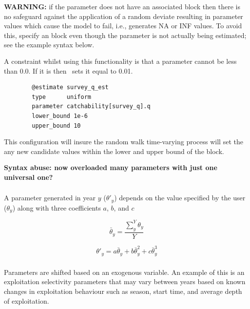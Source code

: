 \textbf{WARNING:} if the parameter does not have an associated  block then there is no safeguard against the application of a random deviate resulting in parameter values which cause the model to fail, i.e., generates NA or INF values. To avoid this, specify an  block even though the parameter is not actually being estimated; see the example syntax below.

A constraint whilst using this functionality is that a parameter cannot be less than 0.0. If it is then \CNAME~sets it equal to 0.01.

{\small{\begin{verbatim}
		@estimate survey_q_est
		type      uniform
		parameter catchability[survey_q].q
		lower_bound 1e-6
		upper_bound 10
		\end{verbatim}}}
	
This configuration will insure the random walk time-varying process will set the any new candidate values within the lower and upper bound of the  block.

\textbf{ Syntax abuse: now overloaded many parameters with just one universal one?}
\subsubsection[Annual shift]{}

A parameter generated in year $y$ ($\theta'_y$) depends on the value specified by the user ($\theta_y$) along with three coefficients $a$, $b$, and $c$

\begin{equation}
\bar{\theta}_y = \frac{\sum_{y}^Y\theta_y}{Y}
\end{equation}

\begin{equation}
\theta'_y = a \bar{\theta}_y + b\bar{\theta}_y^{2} + c\bar{\theta}_y^{3}
\end{equation}

\subsubsection[Exogenous]{}

Parameters are shifted based on an exogenous variable. An example of this is an exploitation selectivity parameters that may vary between years based on known changes in exploitation behaviour such as season, start time, and average depth of exploitation.

